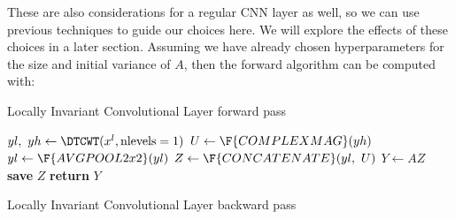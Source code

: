 These are also considerations for a regular CNN layer as well, so we can use
previous techniques to guide our choices here. We will explore the effects of
these choices in a later section. Assuming we have already chosen
hyperparameters for the size and initial variance of $A$, then the forward
algorithm can be computed with:

\begin{algorithm}
\caption{Locally Invariant Convolutional Layer forward pass}\label{euclid}
\begin{algorithmic}[1]
  \State $yl,\ yh \gets \DTCWT(x^l, \mbox{nlevels}=1) $ 
  \State $U \gets \F{COMPLEXMAG}(yh)$
  \State $yl \gets \F{AVGPOOL2x2}(yl)$  
  \State $Z \gets \F{CONCATENATE}(yl,\ U)$ 
  \State $Y \gets AZ$ 
  \State \textbf{save} $Z$ 
  \State \textbf{return} $Y$ 
\EndProcedure
\end{algorithmic}
\end{algorithm}

\begin{algorithm}
\caption{Locally Invariant Convolutional Layer backward
pass}\label{alg:ch5:invbwd}
\begin{algorithmic}[1]
  \State \textbf{load} $Z$
  \State $\dydx{L}{A} \gets \dydx{L}{Y} Z^T$
  \State $\Delta{Z} \gets A^T\dydx{L}{Y}$
  \State $\Delta yl,\ \Delta U \gets \F{UNSTACK}(\Delta Z})$ 
  \State $\Delta yl \gets \F{AVGPOOL2x2BWD}(\Delta yl)$
  \State $\Delta yh \gets \F{COMPLEXMAGBWD}(\Delta U)$
  \State $\dydx{L}{x} \gets \F{DT$\mathbb{C}$}\F{WTBWD}(\Delta yl,\ \Delta yh)$
  \State \textbf{return} $\dydx{L}{x},\ \dydx{L}{A}$
\EndProcedure
\end{algorithmic}
\end{algorithm}

